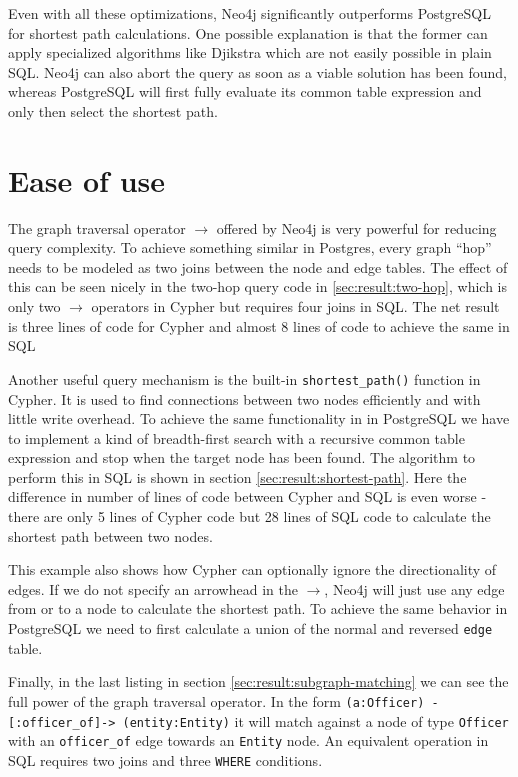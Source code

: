 \documentclass[11pt, a4paper,oneside,chapterprefix=false]{scrbook}
\begin{document}
Even with all these optimizations, Neo4j significantly outperforms PostgreSQL for shortest path calculations.
One possible explanation is that the former can apply specialized algorithms like Djikstra \cite{dijkstra} which are not easily possible in plain SQL. Neo4j can also abort the query as soon as a viable solution has been found, whereas PostgreSQL will first fully evaluate its common table expression and only then select the shortest path.

\section{Ease of use} \label{sec:convenience}

The graph traversal operator $\rightarrow$ offered by Neo4j is very powerful for reducing query complexity.
To achieve something similar in Postgres, every graph ``hop'' needs to be modeled as two joins between the node and edge tables. The effect of this can be seen nicely in the two-hop query code in \ref{sec:result:two-hop}, which is only two $\rightarrow$ operators in Cypher but requires four joins in SQL. The net result is three lines of code for Cypher and almost 8 lines of code to achieve the same in SQL

Another useful query mechanism is the built-in \lstinline{shortest_path()} function in Cypher.
It is used to find connections between two nodes efficiently and with little write overhead.
To achieve the same functionality in in PostgreSQL we have to implement a kind of breadth-first search with a recursive common table expression and stop when the target node has been found.
The algorithm to perform this in SQL is shown in section \ref{sec:result:shortest-path}.
Here the difference in number of lines of code between Cypher and SQL is even worse - there are only 5 lines of Cypher code but 28 lines of SQL code to calculate the shortest path between two nodes.

This example also shows how Cypher can optionally ignore the directionality of edges.
If we do not specify an arrowhead in the $\rightarrow$, Neo4j will just use any edge from or to a node to calculate the shortest path.
To achieve the same behavior in PostgreSQL we need to first calculate a union of the normal and reversed \lstinline{edge} table.

Finally, in the last listing in section \ref{sec:result:subgraph-matching} we can see the full power of the graph traversal operator. In the form \lstinline{(a:Officer) -[:officer_of]-> (entity:Entity)} it will match against a node of type \lstinline{Officer} with an \lstinline{officer_of} edge towards an \lstinline{Entity} node. An equivalent operation in SQL requires two joins and three \lstinline{WHERE} conditions.
\end{document}
